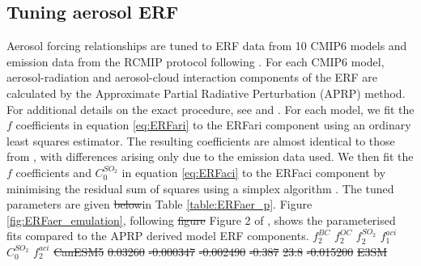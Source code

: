 \documentclass[gmd, manuscript]{copernicus}
\providecommand{\DIFadd}[1]{{\protect\color{blue}#1}} %
\providecommand{\DIFdel}[1]{{\protect\color{red}\sout{#1}}}                      %
\providecommand{\DIFaddbegin}{} %
\providecommand{\DIFaddend}{} %
\providecommand{\DIFdelbegin}{} %
\providecommand{\DIFdelend}{} %
\begin{document}
\subsection{Tuning aerosol ERF} \label{cmip6_erfaer}
Aerosol forcing relationships are tuned to ERF data from 10 CMIP6 models and emission data from the RCMIP protocol \citep{Nicholls2019} following \cite{Smith2020a}. For each CMIP6 model, aerosol-radiation and aerosol-cloud interaction components of the ERF are calculated by the Approximate Partial Radiative Perturbation (APRP) method. For additional details on the exact procedure, see \cite{Smith2020a} and \cite{Zelinka2014}. For each model, we fit the $f$ coefficients in equation \ref{eq:ERFari} to the ERFari component using an ordinary least squares estimator. The resulting coefficients are almost identical to those from \cite{Smith2020a}, with differences arising only due to the emission data used. We then fit the $f$ coefficients and $C_0^{SO_2}$ in equation \ref{eq:ERFaci} to the ERFaci component by minimising the residual sum of squares using a simplex algorithm \citep{Nelder1965}. The tuned parameters are given \DIFdelbegin \DIFdel{below}\DIFdelend \DIFaddbegin \DIFadd{in Table \ref{table:ERFaer_p}}\DIFaddend . Figure \ref{fig:ERFaer_emulation}, following \DIFdelbegin \DIFdel{figure }\DIFdelend \DIFaddbegin \DIFadd{Figure }\DIFaddend 2 of \cite{Smith2020a}, shows the parameterised fits compared to the APRP derived model ERF components.
\DIFdelbegin %
\DIFdel{$f_2^{BC}$ }%
\DIFdel{$f_2^{OC}$ }%
\DIFdel{$f_2^{SO_2}$ }%
\DIFdel{$f_1^{aci}$ }%
\DIFdel{$C_0^{SO_2}$ }%
\DIFdel{$f_2^{aci}$ }%
\DIFdel{CanESM5         }%
\DIFdel{0.03260 }%
\DIFdel{-0.000347 }%
\DIFdel{-0.002490 }%
\DIFdel{-0.387 }%
\DIFdel{23.8 }%
\DIFdel{-0.015200 }%
\DIFdel{E3SM            }%
\end{document}
